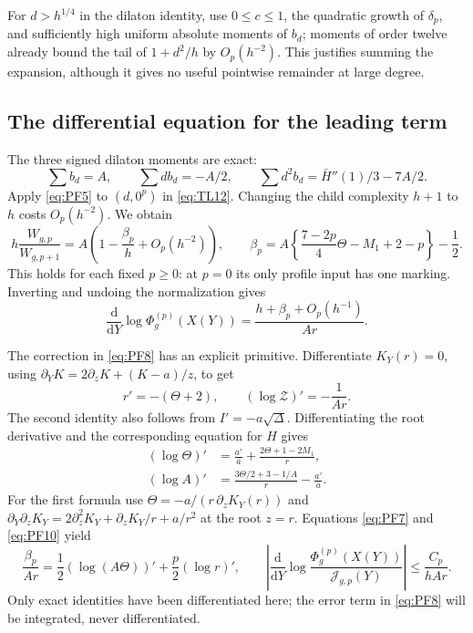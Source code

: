 For $d>h^{1/4}$ in the dilaton identity, use $0\le c\le1$, the
quadratic growth of $\delta_p$, and sufficiently high uniform absolute
moments of $b_d$; moments of order twelve already bound the
tail of $1+d^2/h$ by $O_p(h^{-2})$. This justifies summing the expansion,
although it gives no useful pointwise remainder at large degree.

\subsection{The differential equation for the leading term}

The three signed dilaton moments are exact:
\[
 \sum b_d=A,\qquad \sum d b_d=-A/2,\qquad
 \sum d^2 b_d=\bar H''(1)/3-7A/2.
\]
Apply \eqref{eq:PF5} to $(d,0^p)$ in \eqref{eq:TL12}. Changing the child
complexity $h+1$ to $h$ costs $O_p(h^{-2})$. We obtain
\begin{equation}
 h\frac{W_{g,p}}{W_{g,p+1}}
 =A\left(1-\frac{\beta_p}h+O_p(h^{-2})\right),\qquad
 \beta_p=A\left\{\frac{7-2p}{4}\Theta-M_1+2-p\right\}-\frac12.
 \label{eq:PF7}
\end{equation}
This holds for each fixed $p\ge0$: at $p=0$ its only profile input
has one marking. Inverting and undoing the normalization gives
\begin{equation}
 \frac{\mathrm{d}}{\mathrm{d}Y}\log\Phi_g^{(p)}(X(Y))
 =\frac{h+\beta_p+O_p(h^{-1})}{A r}.
 \label{eq:PF8}
\end{equation}

The correction in \eqref{eq:PF8} has an explicit primitive. Differentiate
$K_Y(r)=0$, using $\partial_YK=2\partial_zK+(K-a)/z$, to get
\begin{equation}
 r'=-(\Theta+2),\qquad
 (\log\mathcal Z)'=-\frac1{Ar}.
 \label{eq:PF9}
\end{equation}
The second identity also follows from $I'=-a\sqrt\Delta$.
Differentiating the root derivative and the corresponding equation
for $H$ gives
\begin{equation}
 \begin{split}
 (\log\Theta)'&=\frac{a'}a+
                  \frac{2\Theta+1-2M_1}{r},\\
 (\log A)'&=\frac{3\Theta/2+3-1/A}{r}-\frac{a'}a.
 \end{split}
 \label{eq:PF10}
\end{equation}
For the first formula use $\Theta=-a/(r\,\partial_zK_Y(r))$ and
$\partial_Y\partial_zK_Y=2\partial_z^2K_Y+\partial_zK_Y/r+a/r^2$ at the root $z=r$.
Equations \eqref{eq:PF7} and \eqref{eq:PF10} yield
\begin{equation}
 \frac{\beta_p}{Ar}
 =\frac12(\log(A\Theta))'+\frac p2(\log r)',\qquad
 \left|\frac{\mathrm{d}}{\mathrm{d}Y}\log
 \frac{\Phi_g^{(p)}(X(Y))}{\mathcal J_{g,p}(Y)}\right|
 \le\frac{C_p}{h A r}.
 \label{eq:PF11}
\end{equation}
Only exact identities have been differentiated here; the error term in
\eqref{eq:PF8} will be integrated, never differentiated.

